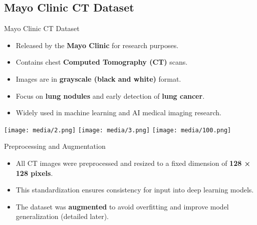 \subsection{Mayo Clinic CT Dataset}

\begin{frame}{Mayo Clinic CT Dataset}
  \begin{itemize}
    \item Released by the \textbf{Mayo Clinic} for research purposes.
    \item Contains chest \textbf{Computed Tomography (CT)} scans.
    \item Images are in \textbf{grayscale (black and white)} format.
    \item Focus on \textbf{lung nodules} and early detection of \textbf{lung cancer}.
    \item Widely used in machine learning and AI medical imaging research.
  \end{itemize}
  \vspace{0.5cm}
  \begin{center}
    \texttt{[image: media/2.png]}
    \hspace{0.3cm}
    \texttt{[image: media/3.png]}
    \hspace{0.3cm}
    \texttt{[image: media/100.png]}
  \end{center}
\end{frame}

\begin{frame}{Preprocessing and Augmentation}
  \begin{itemize}
    \item All CT images were preprocessed and resized to a fixed dimension of \textbf{128 × 128 pixels}.
    \item This standardization ensures consistency for input into deep learning models.
    \item The dataset was \textbf{augmented} to avoid overfitting and improve model generalization (detailed later).
  \end{itemize}
\end{frame}